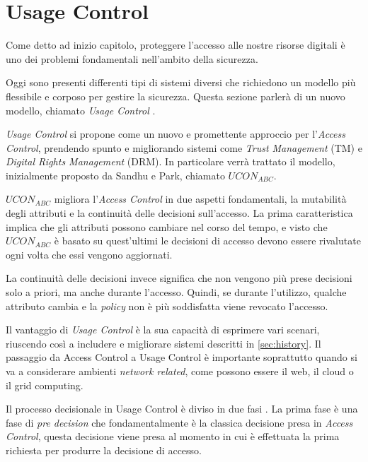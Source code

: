 \section{Usage Control} %
\label{sec:usage_control}
Come detto ad inizio capitolo, proteggere l’accesso alle
nostre risorse digitali è uno dei problemi fondamentali nell’ambito della
sicurezza. \par
Oggi sono presenti differenti tipi di sistemi diversi che richiedono un modello più flessibile e corposo per gestire la sicurezza. Questa sezione parlerà di un nuovo modello, chiamato \textit{Usage Control} \cite{SurveyUsageControl}.\\ \par
\textit{Usage Control} si propone come un nuovo e promettente approccio per l'\textit{Access Control}, prendendo spunto e migliorando sistemi come \textit{Trust Management} (TM) e \textit{Digital Rights Management} (DRM). In particolare verrà trattato il modello, inizialmente proposto da Sandhu e Park\cite{SurveyUsageControl}, chiamato $UCON_{ABC}$. \par
$UCON_{ABC}$ migliora l'\textit{Access Control} in due aspetti fondamentali, la mutabilità degli attributi e la continuità delle decisioni sull'accesso. La prima caratteristica implica che gli attributi possono cambiare nel corso del tempo, e visto che $UCON_{ABC}$ è basato su quest'ultimi le decisioni di accesso devono essere rivalutate ogni volta che essi vengono aggiornati. \par
La continuità delle decisioni invece significa che non vengono più prese decisioni solo a priori, ma anche durante l'accesso. Quindi, se durante l'utilizzo, qualche attributo cambia e la \textit{policy} non è più soddisfatta viene revocato l'accesso.\\ \par
Il vantaggio di \textit{Usage Control} è la sua capacità di esprimere vari scenari, riuscendo così a includere e migliorare sistemi descritti in \ref{sec:history}.
Il passaggio da Access Control a Usage Control è importante soprattutto quando si va a considerare ambienti \textit{network related}, come possono essere il web, il cloud o il grid computing.\\ \par
Il processo decisionale in Usage Control è diviso in due fasi \cite{UsageControlCloud}. La prima fase è una fase di \textit{pre decision} che fondamentalmente è la classica decisione presa in \textit{Access Control}, questa decisione viene presa al momento in cui è effettuata la prima richiesta per produrre la decisione di accesso.
